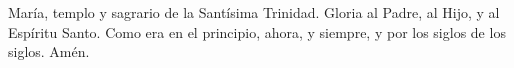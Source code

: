 María, templo y sagrario de la Santísima Trinidad. Gloria al Padre, al Hijo, y al Espíritu Santo. Como era en el principio, 
ahora, y siempre, y por los siglos de los siglos. Amén.
